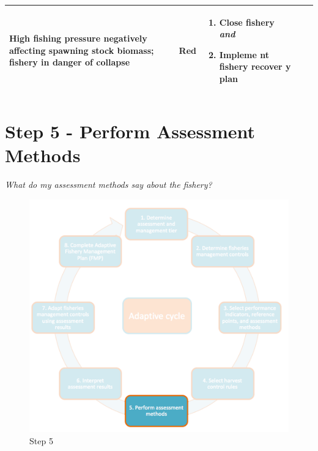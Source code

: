 \documentclass[]{book}
\begin{document}
\begin{longtable}[]{@{}lllll@{}}
\begin{minipage}[t]{0.19\columnwidth}
High fishing pressure negatively affecting spawning stock biomass;
fishery in danger of collapse\strut
\end{minipage} & \begin{minipage}[t]{0.19\columnwidth}\raggedright\strut
Red\strut
\end{minipage} & \begin{minipage}[t]{0.19\columnwidth}\raggedright\strut
\begin{enumerate}
\def\labelenumi{\arabic{enumi}.}
\item
  Close fishery \textbf{\emph{and} }
\item
  Impleme nt fishery recover y plan
\end{enumerate}\strut
\end{minipage}\tabularnewline
\bottomrule
\end{longtable}

\hypertarget{Step5}{\chapter{Step 5 - Perform Assessment
Methods}\label{Step5}}

\emph{What do my assessment methods say about the fishery?}

\begin{figure}
\centering
\includegraphics{myMediaFolder/media/Step5.png}
\caption{\label{fig:Step5}Step 5}
\end{figure}
\end{document}
